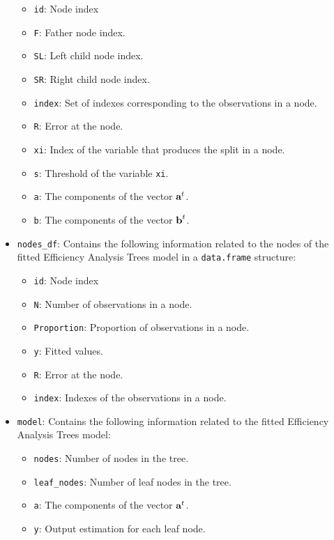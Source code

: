 \begin{itemize}
  \begin{itemize}
  \tightlist
  \item
    \texttt{id}: Node index
  \item
    \texttt{F}: Father node index.
  \item
    \texttt{SL}: Left child node index.
  \item
    \texttt{SR}: Right child node index.
  \item
    \texttt{index}: Set of indexes corresponding to the observations in
    a node.
  \item
    \texttt{R}: Error at the node.
  \item
    \texttt{xi}: Index of the variable that produces the split in a
    node.
  \item
    \texttt{s}: Threshold of the variable \texttt{xi}.
  \item
    \texttt{a}: The components of the vector \({\it \textbf{a}}^{t}\).
  \item
    \texttt{b}: The components of the vector \({\it \textbf{b}}^{t}\).
  \end{itemize}
\item
  \texttt{nodes\_df}: Contains the following information related to the
  nodes of the fitted Efficiency Analysis Trees model in a
  \texttt{data.frame} structure:

  \begin{itemize}
  \tightlist
  \item
    \texttt{id}: Node index
  \item
    \texttt{N}: Number of observations in a node.
  \item
    \texttt{Proportion}: Proportion of observations in a node.
  \item
    \texttt{y}: Fitted values.
  \item
    \texttt{R}: Error at the node.
  \item
    \texttt{index}: Indexes of the observations in a node.
  \end{itemize}
\item
  \texttt{model}: Contains the following information related to the
  fitted Efficiency Analysis Trees model:

  \begin{itemize}
  \tightlist
  \item
    \texttt{nodes}: Number of nodes in the tree.
  \item
    \texttt{leaf\_nodes}: Number of leaf nodes in the tree.
  \item
    \texttt{a}: The components of the vector \({\it \textbf{a}}^{t}\).
  \item
    \texttt{y}: Output estimation for each leaf node.
  \end{itemize}
\end{itemize}

